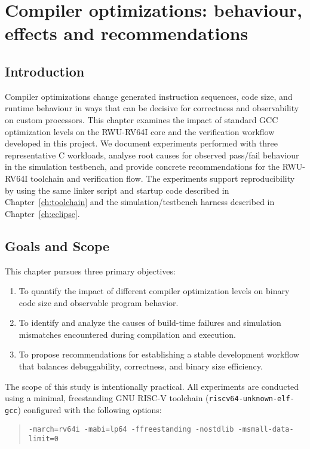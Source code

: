 \chapter{Compiler optimizations: behaviour, effects and recommendations}
\label{ch:optimizations}

\section{Introduction}
Compiler optimizations change generated instruction sequences, code size, and runtime behaviour in ways that can be decisive for correctness and observability on custom processors. This chapter examines the impact of standard GCC optimization levels on the RWU-RV64I core and the verification workflow developed in this project. We document experiments performed with three representative C workloads, analyse root causes for observed pass/fail behaviour in the simulation testbench, and provide concrete recommendations for the RWU-RV64I toolchain and verification flow. The experiments support reproducibility by using the same linker script and startup code described in Chapter~\ref{ch:toolchain} and the simulation/testbench harness described in Chapter~\ref{ch:eclipse}.

\section{Goals and Scope}

This chapter pursues three primary objectives:
\begin{enumerate}
  \item To quantify the impact of different compiler optimization levels on binary code size and observable program behavior.
  \item To identify and analyze the causes of build-time failures and simulation mismatches encountered during compilation and execution.
  \item To propose recommendations for establishing a stable development workflow that balances debuggability, correctness, and binary size efficiency.
\end{enumerate}

The scope of this study is intentionally practical.  
All experiments are conducted using a minimal, freestanding GNU RISC-V toolchain (\texttt{riscv64-unknown-elf-gcc}) configured with the following options:
\begin{quote}
\texttt{-march=rv64i -mabi=lp64 -ffreestanding -nostdlib -msmall-data-limit=0}
\end{quote}

